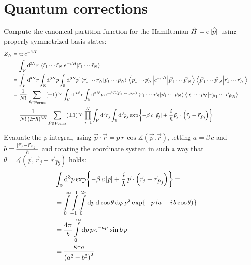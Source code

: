 \documentclass[11pt,a4paper]{scrartcl}
\begin{document}
\newpage

\section{Quantum corrections}

Compute the canonical partition function for the Hamiltonian
$\hat{H}=c\,\abs*{\hat{\vec{p}}}$ using properly symmetrized basis states:
\begin{align*}
    Z_N &= \tr e^{-\beta\hat{H}} \\
    &=
    \int_{V}\dd[3N]{r}\ev{e^{-\beta\hat{H}}}{\vec{r}_{1}\cdots\vec{r}_{N}} \\
    &= \int_{V}\dd[3N]{r}\int_{\mathbb{R}}\dd[3N]{p}\int_{\mathbb{R}}\dd[3N]{p'}
    \braket{\vec{r}_{1}\cdots\vec{r}_{N}}{\vec{p}_{1}\cdots\vec{p}_{N}}
    \mel{\vec{p}_{1}\cdots\vec{p}_{N}}{e^{-\beta\hat{H}}}{\vec{p'}_{1}\cdots\vec{p'}_{N}}
    \braket{\vec{p'}_{1}\cdots\vec{p'}_{N}}{\vec{r}_{1}\cdots\vec{r}_{N}} \\
    &= \frac{1}{N!}\sum_{\hat{P}\in\mathrm{Perms}}(\pm1)^{\eta_{\hat{P}}}
    \int_{V}\dd[3N]{r}\int_{\mathbb{R}}\dd[3N]{p}e^{-\beta
        E(\vec{p}_{1},\cdots,\vec{p}_{N})}
    \braket{\vec{r}_{1}\cdots\vec{r}_{N}}{\vec{p}_{1}\cdots\vec{p}_{N}}
    \braket{\vec{p}_{1}\cdots\vec{p}_{N}}{\vec{r}_{\hat{P}1}\cdots\vec{r}_{\hat{P}N}}
    \\
    &=
    \frac{1}{N!\,(2\pi\hbar)^{3N}}\sum_{\hat{P}\in\mathrm{Perms}}(\pm1)^{\eta_{\hat{P}}}
    \prod_{j=1}^{N}\int_{V}\dd[3]{r_j}\int_{\mathbb{R}}\dd[3]{p_j}
    \exp{-\beta\,c\,\abs{\vec{p}_j}
    +\frac{i}{\hbar}\,\vec{p}_{j}\cdot\left(\vec{r}_{j}-\vec{r}_{\hat{P}j}\right)}
\end{align*}

Evaluate the $p$-integral, using $\vec{p}\cdot\vec{r}=p\,r\,\cos\measuredangle(\vec{p},
\vec{r})$, letting $a=\beta\,c$ and
$b=\frac{\abs*{\vec{r}_{j}-\vec{r}_{\hat{P}j}}}{\hbar}$ and rotating the
coordinate system in such a way that $\theta=\measuredangle(\vec{p},
\vec{r}_{j}-\vec{r}_{\hat{P}j})$ holds:
\begin{align*}
    &\int_{\mathbb{R}}\dd[3]{p}\exp{-\beta\,c\,\abs{\vec{p}}+\frac{i}{\hbar}\,\vec{p}\cdot\left(\vec{r}_{j}-\vec{r}_{\hat{P}j}\right)}
    =\\&=
    \int\limits_{0}^{\infty}\int\limits_{-1}^{1}\int\limits_{0}^{2\pi}\dd{p}\dd{\cos\theta}\dd{\varphi}
    p^2\exp{-p\left(a-i\,b\cos\theta\right)} \\
    &= \frac{4\pi}{b}\int\limits_{0}^{\infty}\dd{p}p\,e^{-ap}\,\sin b\,p \\
    &= \frac{8\pi a}{\left(a^2+b^2\right)^2}
\end{align*}
\end{document}
